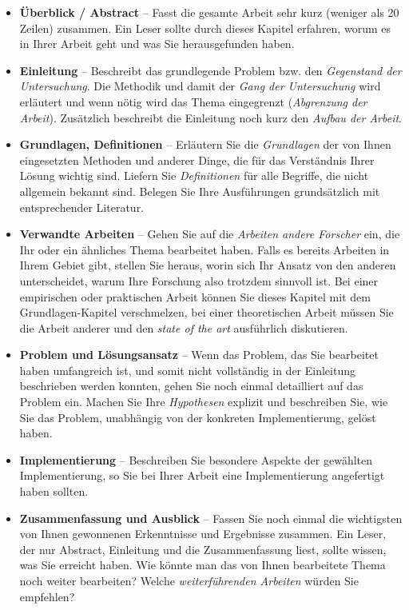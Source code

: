 \documentclass[a4paper,11pt,headings=normal]{scrartcl}
\begin{document}
\begin{itemize}
\item \textbf{Überblick / Abstract} -- Fasst die gesamte Arbeit sehr kurz (weniger als 20 Zeilen) zusammen. Ein Leser sollte durch dieses Kapitel erfahren, worum es in Ihrer Arbeit geht und was Sie herausgefunden haben.

\item \textbf{Einleitung} -- Beschreibt das grundlegende Problem bzw. den \textit{Gegenstand der Untersuchung}. Die Methodik und damit der \textit{Gang der Untersuchung} wird erläutert und wenn nötig wird das Thema eingegrenzt (\textit{Abgrenzung der Arbeit}). Zusätzlich beschreibt die Einleitung noch kurz den \textit{Aufbau der Arbeit}.

\item \textbf{Grundlagen, Definitionen} -- Erläutern Sie die \textit{Grundlagen} der von Ihnen eingesetzten Methoden und anderer Dinge, die für das Verständnis Ihrer Lösung wichtig sind. Liefern Sie \textit{Definitionen} für alle Begriffe, die nicht allgemein bekannt sind. Belegen Sie Ihre Ausführungen grundsätzlich mit entsprechender Literatur.

\item \textbf{Verwandte Arbeiten} -- Gehen Sie auf die \textit{Arbeiten andere Forscher} ein, die Ihr oder ein ähnliches Thema bearbeitet haben. Falls es bereits Arbeiten in Ihrem Gebiet gibt, stellen Sie heraus, worin sich Ihr Ansatz von den anderen unterscheidet, warum Ihre Forschung also trotzdem sinnvoll ist. Bei einer empirischen oder praktischen Arbeit können Sie dieses Kapitel mit dem Grundlagen-Kapitel verschmelzen, bei einer theoretischen Arbeit müssen Sie die Arbeit anderer und den \textit{state of the art} ausführlich diskutieren.

\item \textbf{Problem und Lösungsansatz} -- Wenn das Problem, das Sie bearbeitet haben umfangreich ist, und somit nicht vollständig in der Einleitung beschrieben werden konnten, gehen Sie noch einmal detailliert auf das Problem ein. Machen Sie Ihre \textit{Hypothesen} explizit und beschreiben Sie, wie Sie das Problem, unabhängig von der konkreten Implementierung, gelöst haben.

\item \textbf{Implementierung} -- Beschreiben Sie besondere Aspekte der gewählten Implementierung, so Sie bei Ihrer Arbeit eine Implementierung angefertigt haben sollten.

\item \textbf{Zusammenfassung und Ausblick} -- Fassen Sie noch einmal die wichtigsten von Ihnen gewonnenen Erkenntnisse und Ergebnisse zusammen. Ein Leser, der nur Abstract, Einleitung und die Zusammenfassung liest, sollte wissen, was Sie erreicht haben. Wie könnte man das von Ihnen bearbeitete Thema noch weiter bearbeiten? Welche \textit{weiterführenden Arbeiten} würden Sie empfehlen?
\end{itemize}
\end{document}
